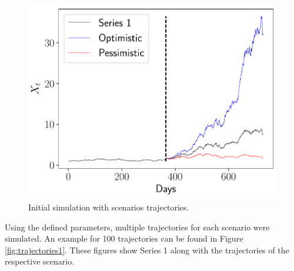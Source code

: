 \documentclass[11pt]{article}
\theoremstyle{definition}
\theoremstyle{remark}
\theoremstyle{remark}
\begin{document}
\begin{figure}[H]
  \centering
  \includegraphics[scale=0.5]{pronostico-1-escenarios.pdf}
  \caption{Initial simulation with scenarios trajectories.}
  \label{fig:scenarios}
\end{figure}

Using the defined parameters, multiple trajectories for each scenario
were simulated. An example for 100 trajectories can be found in Figure
\ref{fig:trajectories1}. These figures show Series 1 along with the
trajectories of the respective scenario.
\end{document}
